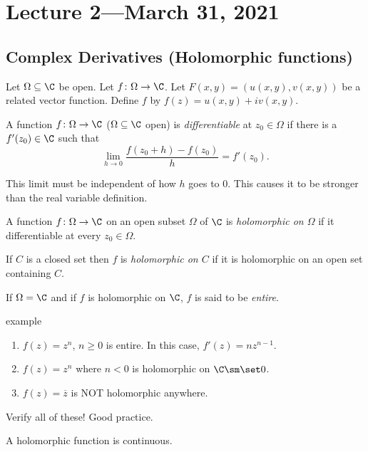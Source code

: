 \documentclass[class=article, crop=false]{standalone}
\begin{document}
\section{Lecture 2---March 31, 2021}

\subsection*{Complex Derivatives (Holomorphic functions)}

Let $\Omega \subseteq \C$ be open. Let $f\colon \Omega \to \C$. Let $F(x,y)= (u(x,y),v(x,y))$ be a related vector function. Define $f$ by $f(z) = u(x,y) + iv(x,y)$.

\begin{defn}
  A function $f\colon \Omega \to \C$ ($\Omega \subseteq \C$ open) is \emph{differentiable} at $z_0 \in \Omega$ if there is a $f'(z_0) \in \C$ such that
    \[
      \lim_{h \to 0} \frac{f(z_0+h)-f(z_0)}{h} = f'(z_0).
    \]
\end{defn}
\begin{rem}
  This limit must be independent of how $h$ goes to $0$. This causes it to be stronger than the real variable definition.
\end{rem}

\begin{defn}
  A function $f\colon \Omega \to \C$ on an open subset $\Omega$ of $\C$ is \emph{holomorphic on $\Omega$} if it differentiable at every $z_0 \in \Omega$.

  If $C$ is a closed set then $f$ is \emph{holomorphic on $C$} if it is holomorphic on an open set containing $C$.

  If $\Omega = \C$ and if $f$ is holomorphic on $\C$, $f$ is said to be \emph{entire}.
\end{defn}

\begin{understandingcheck}{example}
  \begin{enumerate}[(1)]
    \item $f(z) = z^n$, $n \geq 0$ is entire. In this case, $f'(z) = nz^{n-1}$.
    \item $f(z) = z^n$ where $n < 0$ is holomorphic on $\C \sm \set 0$.
    \item $f(z) = \overline z$ is NOT holomorphic anywhere.
  \end{enumerate}
\end{understandingcheck}
\begin{rem}
  Verify all of these! Good practice.
\end{rem}
\begin{rem}
  A holomorphic function is continuous.
\end{rem}
\end{document}
